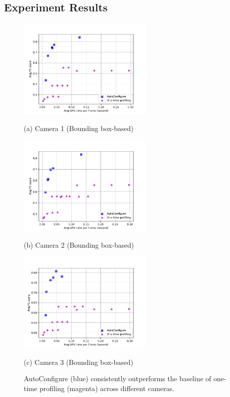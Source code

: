 \subsection{Experiment Results}
\begin{figure}[!t]
	\begin{minipage}[t]{0.32\linewidth}
		\centerline{\includegraphics[width=6.5cm]{figures/Westbound.pdf}}
		\centerline{(a) Camera 1 (Bounding box-based)}
	\end{minipage}
	\hfill
	\begin{minipage}[t]{0.32\linewidth}
		\centerline{\includegraphics[width=6.5cm]{figures/Eastbound.pdf}}
		\centerline{(b) Camera 2 (Bounding box-based)}
	\end{minipage}
	\hfill
	\begin{minipage}[t]{0.32\linewidth}
		\centerline{\includegraphics[width=6.5cm]{figures/Rear.pdf}}
		\centerline{(c) Camera 3 (Bounding box-based)}
	\end{minipage}		
	\caption{AutoConfigure (blue) consistently outperforms the baseline of one-time profiling (magenta) across different cameras.}
	\label{fig: 3dataset results}
\end{figure}

